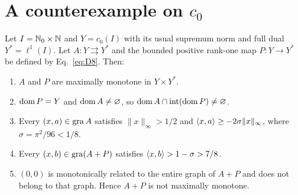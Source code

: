 \section{A counterexample on $c_0$}
\label{sec:c0}
\label{sec:statements}
\renewcommand{\thetheorem}{C}
\begin{theorem}[$c_0$ core]\label{thm:C}
Let $I=\mathbb N_0\times\mathbb N$ and $Y=c_0(I)$ with its usual supremum norm and
full dual $Y^*=\ell^1(I)$. Let $A:Y\rightrightarrows Y^*$ and the bounded
positive rank-one map $P:Y\to Y^*$ be defined by Eq.~\eqref{eq:D8}.
Then:
\begin{enumerate}
\item $A$ and $P$ are maximally monotone in $Y\times Y^*$.
\item $\operatorname{dom} P=Y$ and $\operatorname{dom} A\ne\varnothing$, so
$\operatorname{dom} A\cap\operatorname{int}(\operatorname{dom} P)\ne\varnothing$.
\item Every $(x,a)\in\operatorname{gra} A$ satisfies $\|x\|_\infty>1/2$ and
$\langle x,a\rangle\ge-2\sigma\|x\|_\infty$, where $\sigma=\pi^2/96<1/8$.
\item Every $(x,b)\in\operatorname{gra}(A+P)$ satisfies
$\langle x,b\rangle>1-\sigma>7/8$.
\item $(0,0)$ is monotonically related to the entire graph of $A+P$ and
does not belong to that graph. Hence $A+P$ is not maximally monotone.
\end{enumerate}
\end{theorem}
